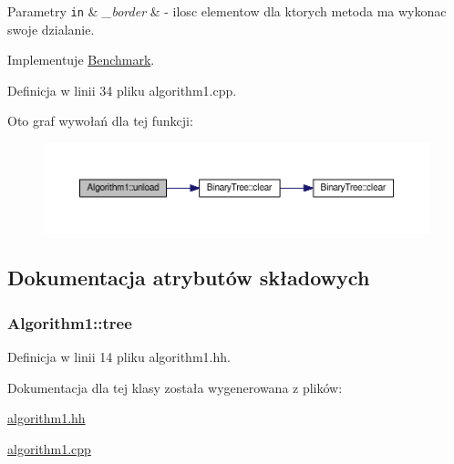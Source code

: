\begin{DoxyParams}[1]{Parametry}
\mbox{\tt in}  & {\em \-\_\-border} & -\/ ilosc elementow dla ktorych metoda ma wykonac swoje dzialanie. \\
\hline
\end{DoxyParams}


Implementuje \hyperlink{class_benchmark_a2dcfb6ee9e648ae88d8c131b2b191bed}{Benchmark}.



Definicja w linii 34 pliku algorithm1.\-cpp.



Oto graf wywołań dla tej funkcji\-:\nopagebreak
\begin{figure}[H]
\begin{center}
\leavevmode
\includegraphics[width=350pt]{class_algorithm1_a135dd26c6c741812d75cd7f2f270592d_cgraph}
\end{center}
\end{figure}




\subsection{Dokumentacja atrybutów składowych}
\hypertarget{class_algorithm1_ad499b054580dfc651ad70274bf5e71b8}{
\subsubsection[{tree}]{ Algorithm1\-::tree\hspace{0.3cm}{\ttfamily [private]}}}\label{class_algorithm1_ad499b054580dfc651ad70274bf5e71b8}


Definicja w linii 14 pliku algorithm1.\-hh.



Dokumentacja dla tej klasy została wygenerowana z plików\-:\begin{DoxyCompactItemize}
\item 
\hyperlink{algorithm1_8hh}{algorithm1.\-hh}\item 
\hyperlink{algorithm1_8cpp}{algorithm1.\-cpp}\end{DoxyCompactItemize}
